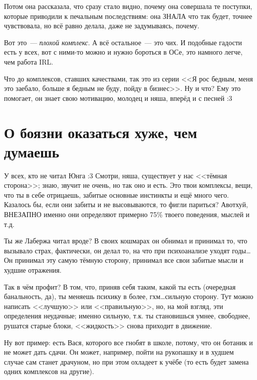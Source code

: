 \documentclass[a4paper,14pt,oneside]{memoir}
\begin{document}
Потом она рассказала, что сразу стало видно, почему она совершала те поступки, которые приводили к печальным последствиям: она ЗНАЛА что так будет, точнее чувствовала, но всё равно делала, даже не задумываясь, почему. 

Вот это~--- \textit{плохой комплекс}. А всё остальное~--- это чих. И подобные гадости есть у всех, вот с ними-то можно и нужно бороться в ОСе, это намного легче, чем работа IRL.

Что до комплексов, ставших качествами, так это из серии <<Я рос бедным, меня это заебало, больше я бедным не буду, пойду в бизнес>>. Ну и что? Ему это помогает, он знает свою мотивацию, молодец и няша, вперёд и с песней :3




\section{О боязни оказаться хуже, чем думаешь}

\medskip
У всех, кто не читал Юнга :3 Смотри, няша, существует у нас <<тёмная сторона>>; знаю, звучит не очень, но так оно и есть. Это твои комплексы, вещи, что ты в себе отрицаешь, забитые основные инстинкты и ещё много чего. Казалось бы, если они забиты и не высовываются, то фигли париться? Авотхуй, ВНЕЗАПНО именно они определяют примерно 75\% твоего поведения, мыслей и т.д.
 
Ты же Лабержа читал вроде? В своих кошмарах он обнимал и принимал то, что вызывало страх, фактически, он делал то, на что при психоанализе уходят годы\ldots Он принимал эту самую тёмную сторону, принимал все свои забитые мысли и худшие отражения.
 
Так в чём профит? В том, что, приняв себя таким, какой ты есть (очередная банальность, да), ты меняешь психику в более, гхм\ldots сильную сторону. Тут можно написать <<лучшую>> или <<правильную>>, но, на мой взгляд, эти определения неудачные; именно сильную, т.к. ты становишься умнее, свободнее, рушатся старые блоки, <<жидкость>> снова приходит в движение. 

Ну вот пример: есть Вася, которого все гнобят в школе, потому, что он ботаник и не может дать сдачи. Он может, например, пойти на рукопашку и в худшем случае сам станет драчуном, но при этом охладеет к учёбе (то есть будет замена одних комплексов на другие).
\end{document}
